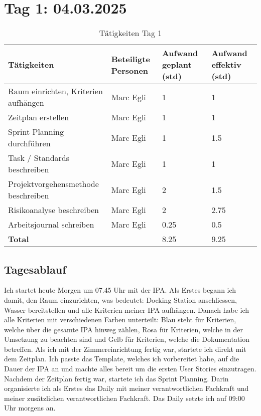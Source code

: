 \section{Tag 1: 04.03.2025}
\begin{table}[H]
    \begin{tabular}{|L{0.4\textwidth}|C{60pt}|C{60pt}|C{60pt}|}
        \hline
        \color{white}Tätigkeiten & \color{white}Beteiligte \color{white}Personen & \color{white}Aufwand geplant (std) & \color{white}Aufwand effektiv (std) \\
        \hline
        Raum einrichten, Kriterien aufhängen & Marc Egli & 1 & 1 \\
        \hline
        Zeitplan erstellen & Marc Egli & 1 & 1 \\
        \hline
        Sprint Planning durchführen & Marc Egli & 1 & 1.5 \\
        \hline
        Task / Standards beschreiben & Marc Egli & 1 & 1 \\
        \hline
        Projektvorgehensmethode beschreiben & Marc Egli & 2 & 1.5 \\
        \hline
        Risikoanalyse beschreiben & Marc Egli & 2 & 2.75 \\
        \hline
        Arbeitsjournal schreiben & Marc Egli & 0.25 & 0.5 \\
        \hline
        \textbf{Total} &  & 8.25 & 9.25 \\
        \hline
    \end{tabular}
    \caption{Tätigkeiten Tag 1}
\end{table}

\subsection*{Tagesablauf}
Ich startet heute Morgen um 07.45 Uhr mit der IPA. Als Erstes begann ich damit, den Raum einzurichten, was bedeutet: 
Docking Station anschliessen, Wasser bereitstellen und alle Kriterien meiner IPA aufhängen. Danach habe ich alle Kriterien mit verschiedenen
Farben unterteilt: Blau steht für Kriterien, welche über die gesamte IPA hinweg zählen, Rosa für Kriterien, welche in der Umsetzung zu beachten sind und 
Gelb für Kriterien, welche die Dokumentation betreffen. Als ich mit der Zimmereinrichtung fertig war, startete ich direkt mit dem Zeitplan. Ich passte das Template,
welches ich vorbereitet habe, auf die Dauer der IPA an und machte alles bereit um die ersten User Stories einzutragen.  Nachdem der Zeitplan fertig war, startete ich das Sprint Planning.
Darin organisierte ich als Erstes das Daily mit meiner verantwortlichen Fachkraft und meiner zusätzlichen verantwortlichen Fachkraft. Das Daily setzte ich auf
09:00 Uhr morgens an. 

